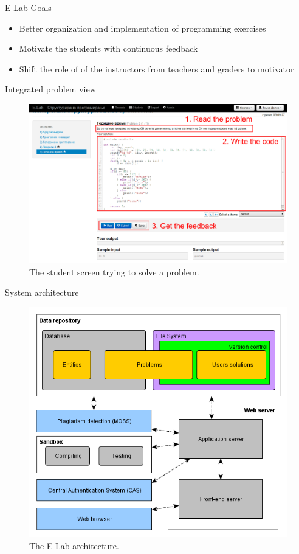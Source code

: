 \begin{frame}{E-Lab Goals}
	\begin{itemize}[<+-| alert@+>]
	  \item Better organization and implementation of programming exercises
	  \item Motivate the students with continuous feedback
	  \item Shift the role of of the instructors from teachers and graders to
	  motivator
	\end{itemize}
\end{frame}

\begin{frame}{Integrated problem view}
	\begin{figure}
		\centering
		\includegraphics[width=.99\textwidth]{images/user_screen}
		\caption{The student screen trying to solve a problem.}
		\label{fig:student_screen}
	\end{figure}
\end{frame}

\begin{frame}{System architecture}
	\begin{figure}
	\centering
		\includegraphics[width=.70\textwidth]{images/architecture}
		\caption{The E-Lab architecture.}
		\label{fig:architecture}
	\end{figure}
\end{frame}

